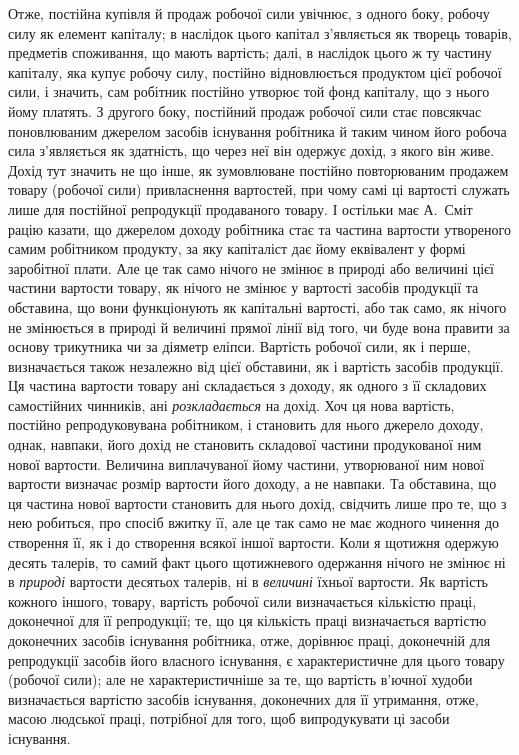 Отже, постійна купівля й продаж робочої сили увічнює, з одного
боку, робочу силу як елемент капіталу; в наслідок цього капітал з’являється
як творець товарів, предметів споживання, що мають вартість;
далі, в наслідок цього ж ту частину капіталу, яка купує робочу силу, постійно
відновлюється продуктом цієї робочої сили, і значить, сам робітник постійно
утворює той фонд капіталу, що з нього йому платять. З другого
боку, постійний продаж робочої сили стає повсякчас поновлюваним джерелом
засобів існування робітника й таким чином його робоча сила
з’являється як здатність, що через неї він одержує дохід, з якого він
живе. Дохід тут значить не що інше, як зумовлюване постійно повторюваним
продажем товару (робочої сили) привласнення вартостей, при
чому самі ці вартості служать лише для постійної репродукції продаваного
товару. І остільки має А.~Сміт рацію казати, що джерелом доходу
робітника стає та частина вартости утвореного самим робітником продукту, за
яку капіталіст дає йому еквівалент у формі заробітної плати. Але це так
само нічого не змінює в природі або величині цієї частини вартости товару,
як нічого не змінює у вартості засобів продукції та обставина, що
вони функціонують як капітальні вартості, або так само, як нічого не
змінюється в природі й величині прямої лінії від того, чи буде вона правити
за основу трикутника чи за діяметр еліпси. Вартість робочої сили,
як і перше, визначається також незалежно від цієї обставини, як і вартість
засобів продукції. Ця частина вартости товару ані складається з доходу,
як одного з її складових самостійних чинників, ані \emph{розкладається} на
дохід. Хоч ця нова вартість, постійно репродуковувана робітником, і становить
для нього джерело доходу, однак, навпаки, його дохід не становить
складової частини продукованої ним нової вартости. Величина виплачуваної
йому частини, утворюваної ним нової вартости визначає розмір
вартости його доходу, а не навпаки. Та обставина, що ця частина нової
вартости становить для нього дохід, свідчить лише про те, що з нею робиться,
про спосіб вжитку її, але це так само не має жодного чинення до створення
її, як і до створення всякої іншої вартости. Коли я щотижня
одержую десять талерів, то самий факт цього щотижневого одержання
нічого не змінює ні в \emph{природі} вартости десятьох талерів, ні в \emph{величині}
їхньої вартости. Як вартість кожного іншого, товару, вартість робочої
сили визначається кількістю праці, доконечної для її репродукції; те, що
ця кількість праці визначається вартістю доконечних засобів існування
робітника, отже, дорівнює праці, доконечній для репродукції засобів його
власного існування, є характеристичне для цього товару (робочої сили);
але не характеристичніше за те, що вартість в’ючної худоби визначається
вартістю засобів існування, доконечних для її утримання, отже,
масою людської праці, потрібної для того, щоб випродукувати ці засоби
існування.

